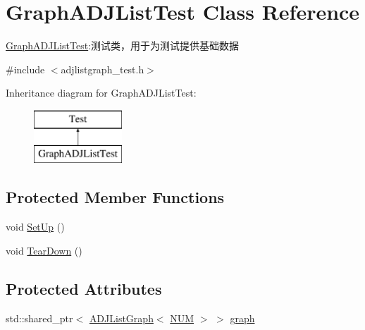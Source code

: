 \hypertarget{class_graph_a_d_j_list_test}{}\section{Graph\+A\+D\+J\+List\+Test Class Reference}
\label{class_graph_a_d_j_list_test}


\hyperlink{class_graph_a_d_j_list_test}{Graph\+A\+D\+J\+List\+Test}\+:测试类，用于为测试提供基础数据  




{\ttfamily \#include $<$adjlistgraph\+\_\+test.\+h$>$}

Inheritance diagram for Graph\+A\+D\+J\+List\+Test\+:\begin{figure}[H]
\begin{center}
\leavevmode
\includegraphics[height=2.000000cm]{class_graph_a_d_j_list_test}
\end{center}
\end{figure}
\subsection*{Protected Member Functions}
\begin{DoxyCompactItemize}
\item 
void \hyperlink{class_graph_a_d_j_list_test_a72021ff735af11b1db48290ea0fa8a6b}{Set\+Up} ()
\item 
void \hyperlink{class_graph_a_d_j_list_test_a79dc8e149913c35045b362c44a5fed46}{Tear\+Down} ()
\end{DoxyCompactItemize}
\subsection*{Protected Attributes}
\begin{DoxyCompactItemize}
\item 
std\+::shared\+\_\+ptr$<$ \hyperlink{struct_introdunction_to_algorithm_1_1_graph_algorithm_1_1_a_d_j_list_graph}{A\+D\+J\+List\+Graph}$<$ \hyperlink{matrixgraph__test_8h_aaf0952059602752258dccaa015d7b54a}{N\+U\+M} $>$ $>$ \hyperlink{class_graph_a_d_j_list_test_af1b700b5e683b43e3e1b215a4d589b6b}{graph}
\end{DoxyCompactItemize}


